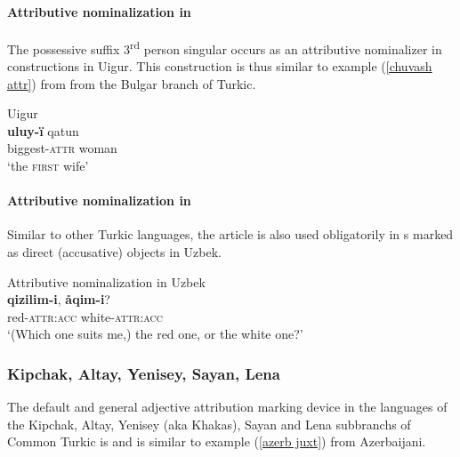 \paragraph*{Attributive nominalization in } 
The possessive suffix 3\textsuperscript{rd} person singular occurs as an attributive nominalizer in  constructions in Uigur. This construction is thus similar to example (\ref{chuvash attr}) from  from the Bulgar branch of Turkic.
\begin{exe}
\ex 
\rm{Uigur \citep[17–18, Footnote 58]{benzing1993b}}\\
\gll	\textbf{uluy-ï} qatun\\
	biggest-\textsc{attr} woman\\
\glt	‘the \textsc{first} wife’
\end{exe}

\paragraph*{Attributive nominalization in }
Similar to other Turkic languages, the article is also used obligatorily in s marked as direct (accusative) objects in Uzbek. 
\begin{exe}
\ex 
\label{uzbek headless acc}	
\rm{Attributive nominalization in Uzbek \citep[371]{boeschoten1998}}\\
 \textbf{qizilim-i}, \textbf{åqim-i}?\\
 	{ } red-\textsc{attr:acc} white-\textsc{attr:acc}\\
\glt 	‘(Which one suits me,) the red one, or the white one?’
\end{exe}

\subsubsection{Kipchak, Altay, Yenisey, Sayan, Lena}
The default and general adjective attribution marking device in the languages of the Kipchak, Altay, Yenisey (aka Khakas), Sayan and Lena subbranchs of Common Turkic is \textbf{} and is similar to example (\ref{azerb juxt}) from Azerbaijani.

